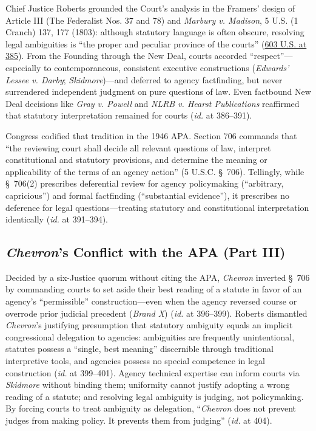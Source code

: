 \documentclass[12pt]{article}
\begin{document}
Chief Justice Roberts grounded the Court's analysis in the Framers' design of Article III (The Federalist Nos. 37 and 78) and \textit{Marbury v. Madison}, 5 U.S. (1 Cranch) 137, 177 (1803): although statutory language is often obscure, resolving legal ambiguities is ``the proper and peculiar province of the courts'' (\href{https://www.law.cornell.edu/supremecourt/text/22-451}{603 U.S. at 385}). From the Founding through the New Deal, courts accorded ``respect''---especially to contemporaneous, consistent executive constructions (\textit{Edwards' Lessee v. Darby}; \textit{Skidmore})---and deferred to agency factfinding, but never surrendered independent judgment on pure questions of law. Even factbound New Deal decisions like \textit{Gray v. Powell} and \textit{NLRB v. Hearst Publications} reaffirmed that statutory interpretation remained for courts (\textit{id.} at 386--391).

Congress codified that tradition in the 1946 APA. Section 706 commands that ``the reviewing court shall decide all relevant questions of law, interpret constitutional and statutory provisions, and determine the meaning or applicability of the terms of an agency action'' (5 U.S.C. \S~706). Tellingly, while \S~706(2) prescribes deferential review for agency policymaking (``arbitrary, capricious'') and formal factfinding (``substantial evidence''), it prescribes no deference for legal questions---treating statutory and constitutional interpretation identically (\textit{id.} at 391--394).

\subsection{\textit{Chevron}'s Conflict with the APA (Part III)}

Decided by a six-Justice quorum without citing the APA, \textit{Chevron} inverted \S~706 by commanding courts to set aside their best reading of a statute in favor of an agency's ``permissible'' construction---even when the agency reversed course or overrode prior judicial precedent (\textit{Brand X}) (\textit{id.} at 396--399). Roberts dismantled \textit{Chevron}'s justifying presumption that statutory ambiguity equals an implicit congressional delegation to agencies: ambiguities are frequently unintentional, statutes possess a ``single, best meaning'' discernible through traditional interpretive tools, and agencies possess no special competence in legal construction (\textit{id.} at 399--401). Agency technical expertise can inform courts via \textit{Skidmore} without binding them; uniformity cannot justify adopting a wrong reading of a statute; and resolving legal ambiguity is judging, not policymaking. By forcing courts to treat ambiguity as delegation, ``\textit{Chevron} does not prevent judges from making policy. It prevents them from judging'' (\textit{id.} at 404).
\end{document}
